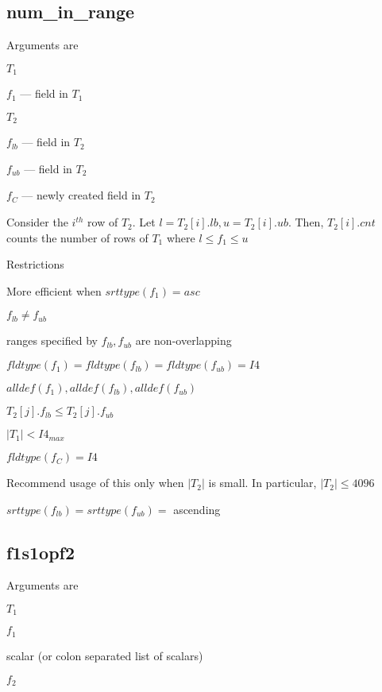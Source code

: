 
\subsection{num\_in\_range}
\label{num_in_range}

Arguments are 
\be
\item \(T_1\)
\item \(f_1\) --- field in \(T_1\)
\item \(T_2\)
\item \(f_{lb}\) --- field in \(T_2\)
\item \(f_{ub}\) --- field in \(T_2\)
\item \(f_C\) --- newly created field in \(T_2\)
\ee

Consider the \(i^{th}\) row of \(T_2\). 
Let \(l = T_2[i].lb, u = T_2[i].ub\). Then, \(T_2[i].cnt\) counts the
number of rows of \(T_1\) where \(l \leq f_1 \leq u\)

Restrictions
\be
\item More efficient when \(srttype(f_1) = asc\)
\item \(f_{lb} \neq f_{ub}\)
\item ranges specified by \(f_{lb},  f_{ub}\) are non-overlapping
\item \(fldtype(f_1) = fldtype(f_{lb}) = fldtype(f_{ub}) = I4\)
\item \(alldef(f_1), alldef(f_{lb}), alldef(f_{ub})\)
\item \(T_2[j].f_{lb} \leq T_2[j].f_{ub}\)
\item \(|T_1| < I4_{max}\)
\item \(fldtype(f_C) = I4\)
\item Recommend usage of this only when \(|T_2|\) is small. In
particular, \(|T_2| \leq 4096\)
\item \(srttype(f_{lb}) = srttype(f_{ub}) = \) ascending
\ee

\subsection{f1s1opf2}
\label{f1s1opf2}

Arguments are 
\be
\item \(T_1\)
\item \(f_1\)
\item scalar (or colon separated list of scalars)
\item \(f_2\)
\ee

